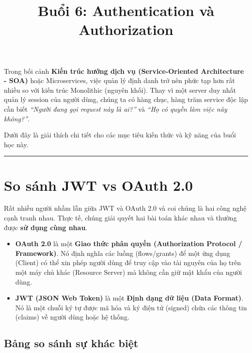\documentclass[12pt,a4paper]{article}
\title{\textbf{Buổi 6: Authentication và Authorization}}
\author{}
\date{}
\begin{document}
\maketitle

Trong bối cảnh \textbf{Kiến trúc hướng dịch vụ (Service-Oriented Architecture - SOA)} hoặc Microservices, việc quản lý định danh trở nên phức tạp hơn rất nhiều so với kiến trúc Monolithic (nguyên khối). Thay vì một server duy nhất quản lý session của người dùng, chúng ta có hàng chục, hàng trăm service độc lập cần biết \textit{``Người đang gọi request này là ai?''} và \textit{``Họ có quyền làm việc này không?''}.

Dưới đây là giải thích chi tiết cho các mục tiêu kiến thức và kỹ năng của buổi học này.

\vspace{0.5cm}
\hrule
\vspace{0.5cm}

\section{So sánh JWT vs OAuth 2.0}

Rất nhiều người nhầm lẫn giữa JWT và OAuth 2.0 và coi chúng là hai công nghệ cạnh tranh nhau. Thực tế, chúng giải quyết hai bài toán khác nhau và thường được \textbf{sử dụng cùng nhau}.

\begin{itemize}
    \item \textbf{OAuth 2.0} là một \textbf{Giao thức phân quyền (Authorization Protocol / Framework)}. Nó định nghĩa các luồng (flows/grants) để một ứng dụng (Client) có thể xin phép người dùng để truy cập vào tài nguyên của họ trên một máy chủ khác (Resource Server) mà không cần giữ mật khẩu của người dùng.
    \item \textbf{JWT (JSON Web Token)} là một \textbf{Định dạng dữ liệu (Data Format)}. Nó là một chuỗi ký tự được mã hóa và ký điện tử (signed) chứa các thông tin (claims) về người dùng hoặc hệ thống.
\end{itemize}

\subsection*{Bảng so sánh sự khác biệt}
\end{document}
